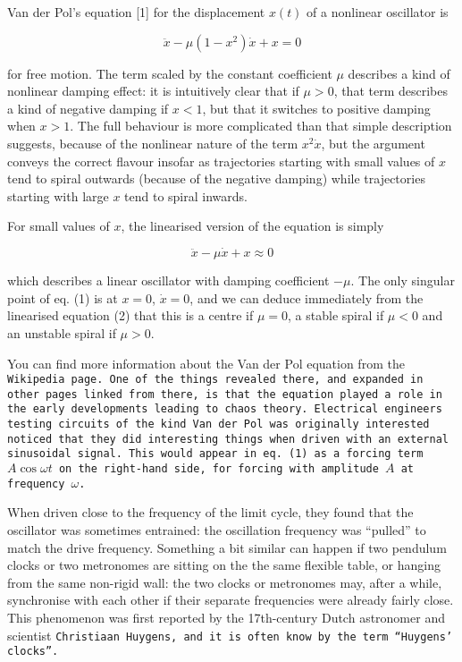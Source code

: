   Van der Pol's equation [1] for the displacement $x(t)$ of a nonlinear 
  oscillator is 

  \begin{equation*}\ddot{x}-\mu (1-x^2) \dot{x} + x =0 \tag{1}\end{equation*} 

  \noindent{}for free motion. The term scaled by the constant coefficient $\mu$ 
  describes a kind of nonlinear damping effect: it is intuitively clear that if 
  $\mu > 0$, that term describes a kind of negative damping if $x < 1$, but 
  that it switches to positive damping when $x > 1$. The full behaviour is more 
  complicated than that simple description suggests, because of the nonlinear 
  nature of the term $x^2 \dot{x}$, but the argument conveys the correct 
  flavour insofar as trajectories starting with small values of $x$ tend to 
  spiral outwards (because of the negative damping) while trajectories starting 
  with large $x$ tend to spiral inwards. 

  For small values of $x$, the linearised version of the equation is simply 

  \begin{equation*}\ddot{x}-\mu \dot{x} + x \approx 0 \tag{2}\end{equation*} 

  \noindent{}which describes a linear oscillator with damping coefficient 
  $-\mu$. The only singular point of eq. (1) is at $x=0$, $\dot{x}=0$, and we 
  can deduce immediately from the linearised equation (2) that this is a centre 
  if $\mu=0$, a stable spiral if $ \mu < 0$ and an unstable spiral if $\mu > 
  0$. 

  You can find more information about the Van der Pol equation from the 
  \tt{}Wikipedia page\rm{}. One of the things revealed there, and expanded in 
  other pages linked from there, is that the equation played a role in the 
  early developments leading to chaos theory. Electrical engineers testing 
  circuits of the kind Van der Pol was originally interested noticed that they 
  did interesting things when driven with an external sinusoidal signal. This 
  would appear in eq. (1) as a forcing term $A \cos \omega t$ on the right-hand 
  side, for forcing with amplitude $A$ at frequency $\omega$. 

  When driven close to the frequency of the limit cycle, they found that the 
  oscillator was sometimes entrained: the oscillation frequency was ``pulled'' 
  to match the drive frequency. Something a bit similar can happen if two 
  pendulum clocks or two metronomes are sitting on the the same flexible table, 
  or hanging from the same non-rigid wall: the two clocks or metronomes may, 
  after a while, synchronise with each other if their separate frequencies were 
  already fairly close. This phenomenon was first reported by the 17th-century 
  Dutch astronomer and scientist \tt{}Christiaan Huygens\rm{}, and it is often 
  know by the term ``Huygens' clocks''. 

